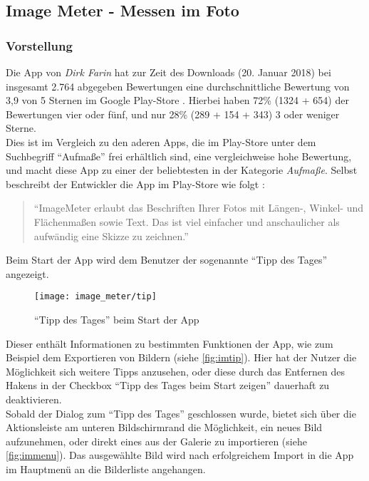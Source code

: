 \subsection{Image Meter - Messen im Foto}

\subsubsection{Vorstellung}
Die App \im{} von \emph{Dirk Farin} hat zur Zeit des Downloads (20. Januar 2018) bei insgesamt 2.764 abgegeben Bewertungen eine durchschnittliche Bewertung von 3,9 von 5 Sternen im Google Play-Store \citep{FarinIM}.
Hierbei haben 72\% (1324 + 654) der Bewertungen vier oder fünf, und nur 28\% (289 + 154 + 343) 3 oder weniger Sterne. \\
Dies ist im Vergleich zu den aderen Apps, die im Play-Store unter dem Suchbegriff ``Aufmaße'' frei erhältlich sind, eine vergleichweise hohe Bewertung, und macht diese App zu einer der beliebtesten in der Kategorie \emph{Aufmaße}.
Selbst beschreibt der Entwickler die App im Play-Store wie folgt \citep{FarinIM}:

\begin{quote}
  ``ImageMeter erlaubt das Beschriften Ihrer Fotos mit Längen-, Winkel- und Flächenmaßen sowie Text.
  Das ist viel einfacher und anschaulicher als aufwändig eine Skizze zu zeichnen.''
\end{quote}

\noindent
Beim Start der App wird dem Benutzer der sogenannte ``Tipp des Tages'' angezeigt. \\

\begin{wrapfigure}{R}{0.5\textwidth}
  \centering
  \texttt{[image: image\_meter/tip]}
  \caption{``Tipp des Tages'' beim Start der App}
  \label{fig:imtip}
\end{wrapfigure}

Dieser enthält Informationen zu bestimmten Funktionen der App, wie zum Beispiel dem Exportieren von Bildern (siehe \autoref{fig:imtip}).
Hier hat der Nutzer die Möglichkeit sich weitere Tipps anzusehen, oder diese durch das Entfernen des Hakens in der Checkbox ``Tipp des Tages beim Start zeigen'' dauerhaft zu deaktivieren. \\

Sobald der Dialog zum ``Tipp des Tages'' geschlossen wurde, bietet sich über die Aktionsleiste am unteren Bildschirmrand die Möglichkeit, ein neues Bild aufzunehmen, oder direkt eines aus der Galerie zu importieren (siehe \autoref{fig:immenu}).
Das ausgewählte Bild wird nach erfolgreichem Import in die App im Hauptmenü an die Bilderliste angehangen. \\

